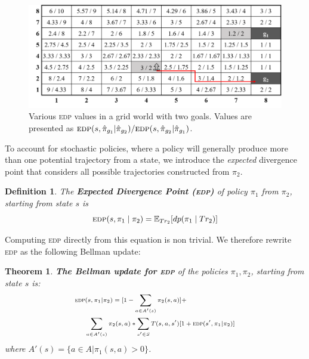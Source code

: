 \documentclass[letterpaper]{article}
\newtheorem{theorem}{Theorem}
\newtheorem{definition}{Definition}
\begin{document}
\begin{figure}
    \centering
    \includegraphics[width=\linewidth]{Figures/EDP_values3.png}
    \caption{Various \textsc{edp} values in a grid world with two goals. Values are presented as $\textsc{edp}(s,\hat{\pi}_{g_1} | \hat{\pi}_{g_2})/\textsc{edp}(s, \hat{\pi}_{g_2} | \hat{\pi}_{g_1})$.}%
    \label{fig:edp}
\end{figure}

To account for stochastic policies, where a policy will generally produce more than one potential trajectory from a state, we introduce the \emph{expected} divergence point that considers all possible trajectories constructed from $\pi_2$.
\begin{definition}
The \textbf{Expected Divergence Point (\textsc{edp})} of policy $\pi_1$ from $\pi_2$, starting from state $s$ is
\begin{equation*}
    \textsc{edp}(s, \pi_1 \mid \pi_2) = \mathbb{E}_{Tr_2}[dp(\pi_{1} \mid Tr_2)]
\end{equation*}
\end{definition}




\noindent Computing \textsc{edp} directly from this equation is non trivial. We therefore rewrite \textsc{edp} as the following Bellman update:
\begin{theorem}
\label{thm:bellman}
\textbf{The Bellman update for \textsc{edp}} of the policies $\pi_1, \pi_2$, starting from state $s$ is:
\begin{equation}
\scriptsize
\begin{split}
    \textsc{edp} & (s, \pi_1 |  \pi_2) = [1 - \sum\limits_{a\in A'(s)}\pi_2(s, a)] + \\ &
    \sum\limits_{a\in A'(s)}\pi_2(s,a) * \sum\limits_{s'\in S}T(s, a, s')[1 + \textsc{edp}(s', \pi_1 |  \pi_2)]
\end{split}
\normalsize
\label{eq:bellman}
\end{equation}
where $A'(s)=\{a\in A | \pi_1(s, a) > 0\}$.
\end{theorem}
\end{document}
